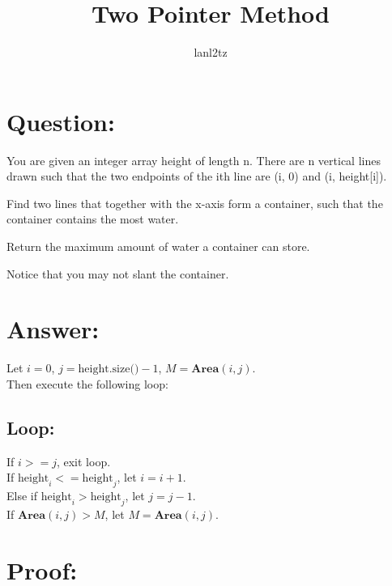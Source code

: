 \documentclass{article}
\title{Two Pointer Method}
\author{lanl2tz}
\begin{document}
\maketitle
\section*{Question:}
You are given an integer array height of length n. There are n vertical lines drawn such that the two endpoints of the ith line are (i, 0) and (i, height[i]).

Find two lines that together with the x-axis form a container, such that the container contains the most water.

Return the maximum amount of water a container can store.

Notice that you may not slant the container.

\section*{Answer:}
Let $i = 0$, $j = \text{height.size()} - 1$, $M = \textbf{Area}(i, j)$.\\
Then execute the following loop:
\subsection*{Loop:}
If $i >= j$, exit loop.\\
If $\text{height}_{i} <= \text{height}_{j}$, let $i = i + 1$.\\
Else if $\text{height}_{i} > \text{height}_{j}$, let $j = j - 1$.\\
If $\textbf{Area}(i, j) > M$, let $M = \textbf{Area}(i, j)$.
\section*{Proof:}
\end{document}
